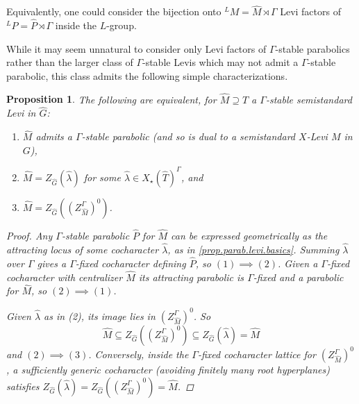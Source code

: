 \documentclass[openany]{amsbook}
\newtheorem{proposition}[theorem]{Proposition}
\theoremstyle{definition}
\theoremstyle{remark}
\numberwithin{equation}{section}
\renewcommand{\-}{\operatorname{-}}
\begin{document}
Equivalently, one could consider the bijection onto ${}^L M = \widehat{M} \rtimes \Gamma$ Levi factors of ${}^L P = \widehat{P} \rtimes \Gamma$ inside the $L$-group.

While it may seem unnatural to consider only Levi factors of $\Gamma$-stable parabolics rather than the larger class of $\Gamma$-stable Levis which may not admit a $\Gamma$-stable parabolic, this class admits the following simple characterizations.
\begin{proposition}\label{prop.characterizing.dual.Levis}
    The following are equivalent, for $\widehat{M} \supseteq \widehat{T}$ a $\Gamma$-stable semistandard Levi in $\widehat{G}$:
    \begin{enumerate}
        \item $\widehat{M}$ admits a $\Gamma$-stable parabolic (and so is dual to a semistandard $X$-Levi $M$ in $G$),
        \item $\widehat{M} = Z_{\widehat{G}}(\widehat{\lambda})$ for some $\widehat{\lambda} \in X_\star(\widehat{T})^\Gamma$, and
        \item $\widehat{M} = Z_{\widehat{G}}((Z_{\widehat{M}}^{\Gamma})^0)$.
    \end{enumerate}
    \begin{proof}
        Any $\Gamma$-stable parabolic $\widehat{P}$ for $\widehat{M}$ can be expressed geometrically as the attracting locus of some cocharacter $\widehat{\lambda}$, as in \ref{prop.parab.levi.basics}. Summing $\widehat{\lambda}$ over $\Gamma$ gives a $\Gamma$-fixed cocharacter defining $\widehat{P}$, so $(1) \implies (2)$. Given a $\Gamma$-fixed cocharacter with centralizer $\widehat{M}$ its attracting parabolic is $\Gamma$-fixed and a parabolic for $\widehat{M}$, so $(2) \implies (1)$. 

        Given $\widehat{\lambda}$ as in (2), its image lies in $(Z_{\widehat{M}}^{\Gamma})^0$. So
        $$
            \widehat{M} \subseteq Z_{\widehat{G}}((Z_{\widehat{M}}^{\Gamma})^0) \subseteq Z_{\widehat{G}}(\widehat{\lambda}) = \widehat{M}
        $$
        and $(2) \implies (3)$. Conversely, inside the $\Gamma$-fixed cocharacter lattice for $(Z_{\widehat{M}}^{\Gamma})^0$, a sufficiently generic cocharacter (avoiding finitely many root hyperplanes) satisfies $Z_{\widehat{G}}(\widehat{\lambda}) = Z_{\widehat{G}}((Z_{\widehat{M}}^{\Gamma})^0) = \widehat{M}$.
    \end{proof}
\end{proposition}
\end{document}
